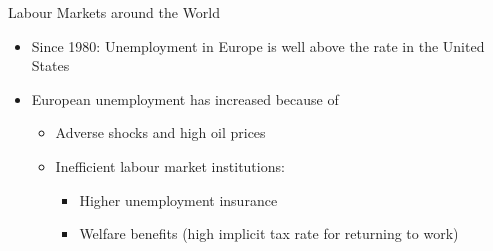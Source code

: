 \documentclass[aspectratio=1610]{beamer}
\begin{document}
%	
%

\begin{frame}[wide]{Labour Markets around the World}
	\begin{itemize}
		\item Since 1980: Unemployment in Europe is well above the rate in the United States
		\vspace{2mm}
		\item European unemployment has increased because of
		\vspace{1mm}
		\begin{itemize}
			\item Adverse shocks and high oil prices
			\item Inefficient labour market institutions:
			\vspace{1mm}
			\begin{itemize}
				\item Higher unemployment insurance
				\item Welfare benefits (high implicit tax rate for returning to work)
			\end{itemize}
		\end{itemize}
	\end{itemize}
\end{frame}
\end{document}
